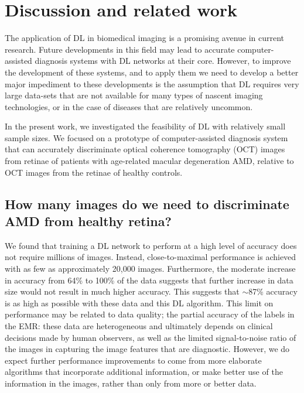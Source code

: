 \section{Discussion and related work}

The application of DL in biomedical imaging is a promising avenue in current
research. Future developments in this field may lead to accurate
computer-assisted diagnosis systems with DL networks at their core. However, to improve the development of these systems, and to apply them we need to develop a better
major impediment to these developments is the assumption that DL requires very
large data-sets that are not available for many types of nascent imaging
technologies, or in the case of diseases that are relatively uncommon.

In the present work, we investigated the feasibility of DL with relatively small
sample sizes. We focused on a prototype of computer-assisted diagnosis system
that can accurately discriminate optical coherence tomography (OCT) images from
retinae of patients with age-related macular degeneration AMD, relative to OCT
images from the retinae of healthy controls.

\subsection{How many images do we need to discriminate AMD from healthy retina?}

We found that training a DL network to perform at a high level of accuracy does
not require millions of images. Instead, close-to-maximal performance is
achieved with as few as approximately 20,000 images. Furthermore, the moderate
increase in accuracy from 64\% to 100\% of the data suggests that further
increase in data size would not result in much higher accuracy. This suggests
that $\sim$87\% accuracy is as high as possible with these data and this DL
algorithm. This limit on performance may be related to data quality; the partial
accuracy of the labels in the EMR: these data are heterogeneous and ultimately
depends on clinical decisions made by human observers, as well as the limited
signal-to-noise ratio of the images in capturing the image features that are
diagnostic. However, we do expect further performance improvements to come from
more elaborate algorithms that incorporate additional information, or make
better use of the information in the images, rather than only from more or
better data.

